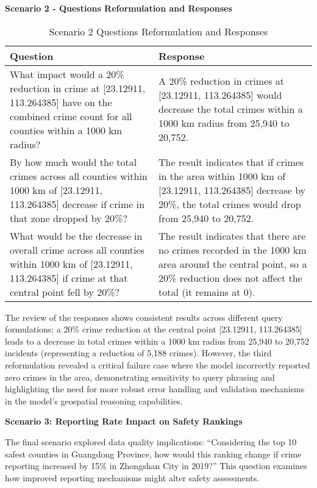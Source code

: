 \noindent \textbf{Scenario 2 - Questions Reformulation and Responses}
\begin{table}[hbtp]
\centering
\small
\begin{tabular}{|p{}|p{}|}
\hline
\textbf{Question} & \textbf{Response} \\
\hline
What impact would a 20\% reduction in crime at [23.12911, 113.264385] have on the combined crime count for all counties within a 1000 km radius? & A 20\% reduction in crimes at [23.12911, 113.264385] would decrease the total crimes within a 1000 km radius from 25,940 to 20,752.  \\
\hline
 By how much would the total crimes across all counties within 1000 km of [23.12911, 113.264385] decrease if crime in that zone dropped by 20\%? & The result indicates that if crimes in the area within 1000 km of [23.12911, 113.264385] decrease by 20\%, the total crimes would drop from 25,940 to 20,752.   \\
\hline
What would be the decrease in overall crime across all counties within 1000 km of [23.12911, 113.264385] if crime at that central point fell by 20\%? & The result indicates that there are no crimes recorded in the 1000 km area around the central point, so a 20\% reduction does not affect the total (it remains at 0).\\
\hline
\end{tabular}
\caption{Scenario 2 Questions Reformulation and Responses}
\label{tab:questions_responses_2}
\end{table}

The review of the responses shows consistent results across different query formulations: a 20\% crime reduction at the central point [23.12911, 113.264385] leads to a decrease in total crimes within a 1000 km radius from 25,940 to 20,752 incidents (representing a reduction of 5,188 crimes). However, the third reformulation revealed a critical failure case where the model incorrectly reported zero crimes in the area, demonstrating sensitivity to query phrasing and highlighting the need for more robust error handling and validation mechanisms in the model's geospatial reasoning capabilities.


\noindent \textbf{Scenario 3: Reporting Rate Impact on Safety Rankings}

The final scenario explored data quality implications: ``Considering the top 10 safest counties in Guangdong Province, how would this ranking change if crime reporting increased by 15\% in Zhongshan City in 2019?'' This question examines how improved reporting mechanisms might alter safety assessments.

